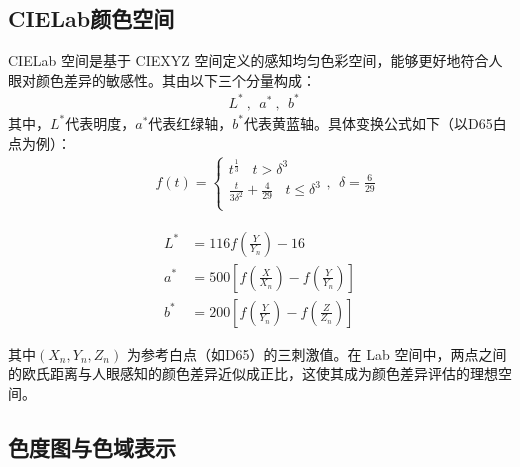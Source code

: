 \subsection[\hspace{-2pt}CIELab颜色空间]{{\heiti{} \hspace{-8pt}CIELab颜色空间}}\label{subsection2: CIELab颜色空间}

CIELab 空间是基于 CIEXYZ 空间定义的感知均匀色彩空间，能够更好地符合人眼对颜色差异的敏感性。其由以下三个分量构成：
\begin{equation}
\begin{aligned}
  &L^{*}\ ,\ \ a^{*}\ ,\ \ b^{*}\ 
\end{aligned}
\end{equation}
其中，$L^{*}$代表明度，$a^{*}$代表红绿轴，$b^{*}$代表黄蓝轴。具体变换公式如下（以D65白点为例）：
\begin{equation}
\begin{aligned}
  &f(t) = 
\begin{cases}
  t^{\frac{1}{3}}\ \ \ \ t>\delta^{3}\\
  \frac{t}{3\delta^{2}}+\frac{4}{29}\ \ \ \ t\leq \delta^{3}\\
\end{cases}
,\ \ \delta=\frac{6}{29}
\end{aligned}
\end{equation}

\begin{equation}
\begin{aligned}
  L^{*} &= 116f\left(\frac{Y}{Y_{n}}\right)-16\\
  a^{*} &= 500\left[f\left(\frac{X}{X_{n}}\right)-f\left(\frac{Y}{Y_{n}}\right)\right]\\
  b^{*} &= 200\left[f\left(\frac{Y}{Y_{n}}\right)-f\left(\frac{Z}{Z_{n}}\right)\right]
\end{aligned}
\end{equation}

其中$(X_{n},Y_{n},Z_{n})$ 为参考白点（如D65）的三刺激值。在 Lab 空间中，两点之间的欧氏距离与人眼感知的颜色差异近似成正比，这使其成为颜色差异评估的理想空间。\cite{hunter1958photoelectric}

\subsection[\hspace{-2pt}色度图与色域表示]{{\heiti{} \hspace{-8pt}色度图与色域表示}}\label{subsection2: 色度图与色域表示}

